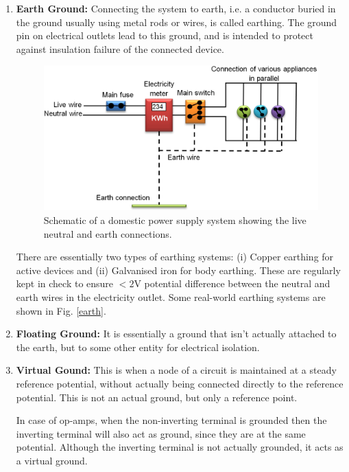 \begin{enumerate}
    \item \textbf{Earth Ground:} Connecting the system to earth, i.e. a conductor buried in the ground usually using metal rods or wires, is called earthing. The ground pin on electrical outlets lead to this ground, and is intended to protect against insulation failure of the connected device.
    \begin{figure}[H]
        \centering
        \includegraphics[width=0.85\columnwidth]{images/domestic.png}
        \caption{Schematic of a domestic power supply system showing the live neutral and earth connections.}
        \label{dom}
    \end{figure}
    There are essentially two types of earthing systems: (i) Copper earthing for active devices and (ii) Galvanised iron for body earthing. These are regularly kept in check to ensure $< 2$V potential difference between the neutral and earth wires in the electricity outlet. Some real-world earthing systems are shown in Fig. \ref{earth}.\\
    \item \textbf{Floating Ground:} It is essentially a ground that isn't actually attached to the earth, but to some other entity for electrical isolation.\\
    \item \textbf{Virtual Gound:} This is when a node of a circuit is maintained at a steady reference potential, without actually being connected directly to the reference potential. This is not an actual ground, but only a reference point. 
    
    In case of op-amps, when the non-inverting terminal is grounded then the inverting terminal will also act as ground, since they are at the same potential. Although the inverting terminal is not actually grounded, it acts as a virtual ground.\\
\end{enumerate}

